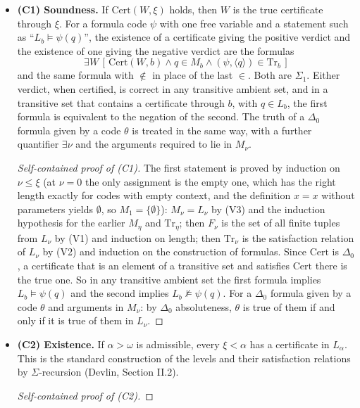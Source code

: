 \documentclass[11pt]{article}
\begin{document}
\begin{itemize}
\item \textbf{(C1) Soundness.} If $\mathrm{Cert}(W, \xi)$ holds, then $W$ is the true certificate through $\xi$. For
  a formula code $\psi$ with one free variable and a statement such as ``$L_b \models \psi(q)$'', the existence of a
  certificate giving the positive verdict and the existence of one giving the negative verdict are the formulas
  \[ \exists W\, [\, \mathrm{Cert}(W, b) \wedge q \in M_b \wedge (\psi, \langle q \rangle) \in \mathrm{Tr}_b\, ] \]
  and the same formula with $\notin$ in place of the last $\in$. Both are $\Sigma_1$. Either verdict, when certified,
  is correct in any transitive ambient set, and in a transitive set that contains a certificate through $b$, with
  $q \in L_b$, the first formula is equivalent to the negation of the second. The truth of a $\Delta_0$ formula given
  by a code $\theta$ is treated in the same way, with a further quantifier $\exists \nu$ and the arguments required to
  lie in $M_\nu$.
  \begin{proof}[Self-contained proof of (C1)]
  The first statement is proved by induction on $\nu \le \xi$ (at $\nu = 0$ the only assignment is the empty one, which has the right length
  exactly for codes with empty context, and the definition $x = x$ without parameters yields $\emptyset$, so $M_1 = \{\emptyset\}$):
  $M_\nu = L_{\nu}$ by (V3) and the induction hypothesis for the earlier
  $M_\eta$ and $\mathrm{Tr}_\eta$; then $F_\nu$ is the set of all finite tuples from $L_{\nu}$ by (V1) and induction on
  length; then $\mathrm{Tr}_\nu$ is the satisfaction relation of $L_{\nu}$ by (V2) and induction on the construction of
  formulas. Since $\mathrm{Cert}$ is $\Delta_0$, a certificate that is an element of a transitive set and satisfies
  $\mathrm{Cert}$ there is the true one. So in any transitive ambient set the first formula implies
  $L_b \models \psi(q)$ and the second implies $L_b \nvDash \psi(q)$. For a $\Delta_0$ formula given by a code
  $\theta$ and arguments in $M_\nu$: by $\Delta_0$ absoluteness, $\theta$ is true of them if and only if it is true of
  them in $L_{\nu}$.
  \end{proof}
\item \textbf{(C2) Existence.} If $\alpha > \omega$ is admissible, every $\xi < \alpha$ has a certificate in
  $L_{\alpha}$. This is the standard construction of the levels and their satisfaction relations by
  $\Sigma$-recursion (Devlin, Section II.2).
  \begin{proof}[Self-contained proof of (C2)]

\end{proof}
\end{itemize}
\end{document}
